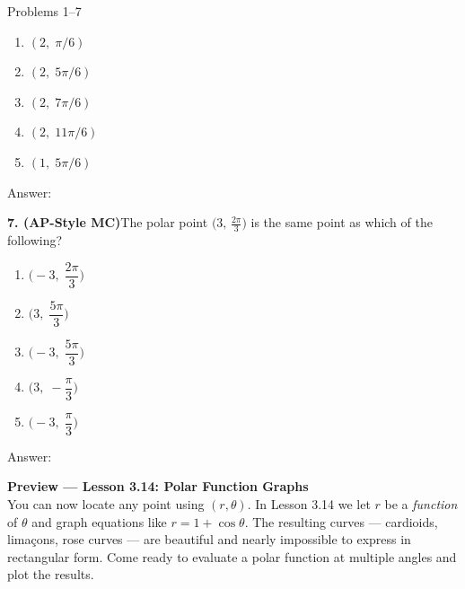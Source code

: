 \documentclass[10pt]{article}
\begin{document}
\begin{notesbox}{Problems 1--7}
\begin{enumerate}[label=(\Alph*), leftmargin=2em, itemsep=3pt]
  \item $(2,\; \pi/6)$
  \item $(2,\; 5\pi/6)$
  \item $(2,\; 7\pi/6)$
  \item $(2,\; 11\pi/6)$
  \item $(1,\; 5\pi/6)$
\end{enumerate}

Answer: \underline{\hspace{1.5cm}}

\vspace{0.12in}
\textbf{7. (AP-Style MC)}\quad The polar point $\bigl(3,\, \tfrac{2\pi}{3}\bigr)$
is the same point as which of the following?

\begin{enumerate}[label=(\Alph*), leftmargin=2em, itemsep=3pt]
  \item $\bigl(-3,\; \dfrac{2\pi}{3}\bigr)$
  \item $\bigl(3,\; \dfrac{5\pi}{3}\bigr)$
  \item $\bigl(-3,\; \dfrac{5\pi}{3}\bigr)$
  \item $\bigl(3,\; -\dfrac{\pi}{3}\bigr)$
  \item $\bigl(-3,\; \dfrac{\pi}{3}\bigr)$
\end{enumerate}

Answer: \underline{\hspace{1.5cm}}

\end{notesbox}

\vspace{0.08in}

\begin{tcolorbox}[colback=navylight, colframe=navy, arc=2mm,
    left=3mm, right=3mm, top=2mm, bottom=2mm]
\small\textbf{Preview --- Lesson 3.14: Polar Function Graphs}\\
You can now locate any point using $(r,\theta)$. In Lesson 3.14 we let $r$
be a \emph{function} of $\theta$ and graph equations like $r = 1+\cos\theta$.
The resulting curves --- cardioids, limaçons, rose curves --- are beautiful
and nearly impossible to express in rectangular form. Come ready to evaluate
a polar function at multiple angles and plot the results.
\end{tcolorbox}
\end{document}
